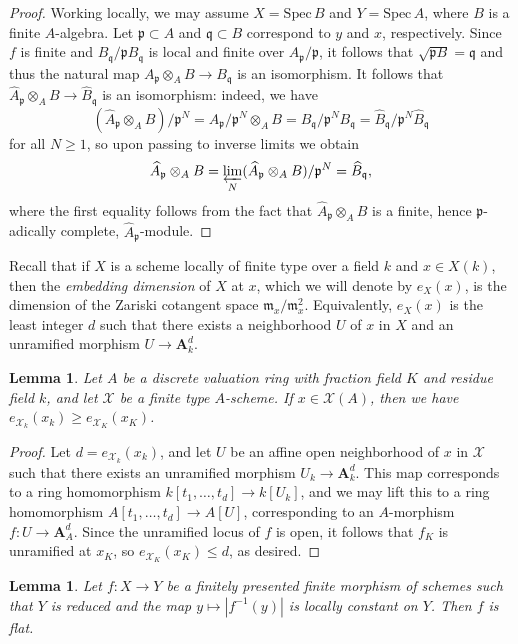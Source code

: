 \documentclass[11pt,reqno]{amsart}
\newtheorem{lemma}[theorem]{Lemma}
\theoremstyle{definition}
\newcommand{\Spec}{\mathrm{Spec} \,}
\newcommand{\bA}{{\mathbf A}}
\newcommand{\sX}{{\mathscr X}}
\newcommand{\fm}{\mathfrak{m}}
\newcommand{\fp}{\mathfrak{p}}
\newcommand{\fq}{\mathfrak{q}}
\begin{document}
\begin{proof}
    Working locally, we may assume $X = \Spec B$ and $Y = \Spec A$, where $B$ is a finite $A$-algebra. Let $\fp \subset A$ and $\fq \subset B$ correspond to $y$ and $x$, respectively. Since $f$ is finite and $B_\fq/\fp B_\fq$ is local and finite over $A_\fp/\fp$, it follows that $\sqrt{\fp B} = \fq$ and thus the natural map $A_{\fp} \otimes_A B \to B_{\fq}$ is an isomorphism. It follows that $\widehat{A}_\fp \otimes_A B \to \widehat{B}_\fq$ is an isomorphism: indeed, we have 
    \[
    (\widehat{A}_\fp \otimes_A B)/\fp^N = A_\fp/\fp^N \otimes_A B = B_\fq/\fp^N B_\fq = \widehat{B}_\fq/\fp^N \widehat{B}_\fq
    \]
    for all $N \geq 1$, so upon passing to inverse limits we obtain
    \[
    \widehat{A}_\fp \otimes_A B = \varprojlim_N (\widehat{A}_\fp \otimes_A B)/\fp^N = \widehat{B}_\fq,
    \]
    where the first equality follows from the fact that $\widehat{A}_\fp \otimes_A B$ is a finite, hence $\fp$-adically complete, $\widehat{A}_\fp$-module.
\end{proof}




Recall that if $X$ is a scheme locally of finite type over a field $k$ and $x \in X(k)$, then the \textit{embedding dimension} of $X$ at $x$, which we will denote by $e_X(x)$, is the dimension of the Zariski cotangent space $\fm_x/\fm_x^2$. Equivalently, $e_X(x)$ is the least integer $d$ such that there exists a neighborhood $U$ of $x$ in $X$ and an unramified morphism $U \to \bA_k^d$.

\begin{lemma}\label{lemma:emb-dim-ineq}
    Let $A$ be a discrete valuation ring with fraction field $K$ and residue field $k$, and let $\sX$ be a finite type $A$-scheme. If $x \in \sX(A)$, then we have $e_{\sX_k}(x_k) \geq e_{\sX_K}(x_K)$.
\end{lemma}

\begin{proof}
    Let $d = e_{\sX_k}(x_k)$, and let $U$ be an affine open neighborhood of $x$ in $\sX$ such that there exists an unramified morphism $U_k \to \bA_k^d$. This map corresponds to a ring homomorphism $k[t_1, \dots, t_d] \to k[U_k]$, and we may lift this to a ring homomorphism $A[t_1, \dots, t_d] \to A[U]$, corresponding to an $A$-morphism $f\colon U \to \bA_A^d$. Since the unramified locus of $f$ is open, it follows that $f_K$ is unramified at $x_K$, so $e_{\sX_K}(x_K) \leq d$, as desired.
\end{proof}

\begin{lemma}
	Let $f\colon X \to Y$ be a finitely presented finite morphism of schemes such that $Y$ is reduced and the map $y \mapsto |f^{-1}(y)|$ is locally constant on $Y$. Then $f$ is flat.
\end{lemma}
\end{document}
